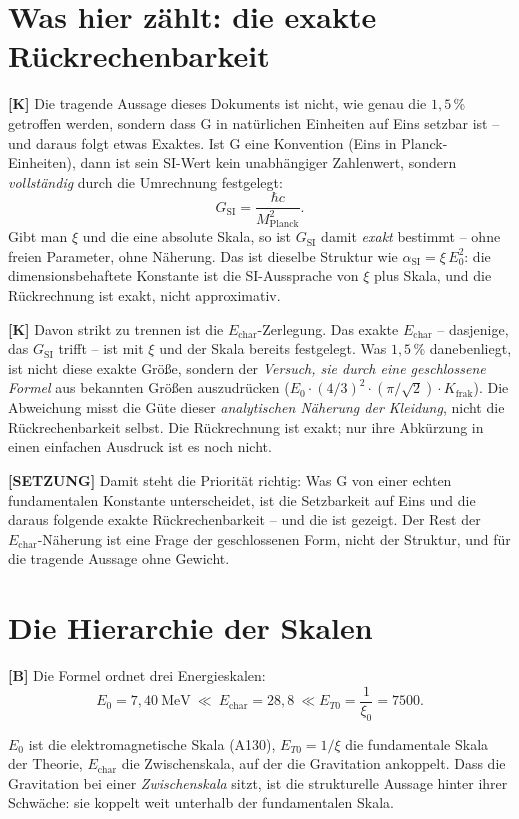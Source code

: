 \section{Was hier zählt: die exakte Rückrechenbarkeit}

\textbf{[K]} Die tragende Aussage dieses Dokuments ist nicht, wie genau die
$1{,}5\,\%$ getroffen werden, sondern dass G in natürlichen Einheiten auf Eins
setzbar ist -- und daraus folgt etwas Exaktes. Ist G eine Konvention (Eins in
Planck-Einheiten), dann ist sein SI-Wert kein unabhängiger Zahlenwert, sondern
\emph{vollständig} durch die Umrechnung festgelegt:
\[
  G_\text{SI} = \frac{\hbar c}{M_\text{Planck}^2} .
\]
Gibt man $\xi$ und die eine absolute Skala, so ist $G_\text{SI}$ damit
\emph{exakt} bestimmt -- ohne freien Parameter, ohne Näherung. Das ist dieselbe
Struktur wie $\alpha_\text{SI} = \xi\,E_0^2$: die dimensionsbehaftete Konstante
ist die SI-Aussprache von $\xi$ plus Skala, und die Rückrechnung ist exakt, nicht
approximativ.

\textbf{[K]} Davon strikt zu trennen ist die $E_\text{char}$-Zerlegung. Das exakte
$E_\text{char}$ -- dasjenige, das $G_\text{SI}$ trifft -- ist mit $\xi$ und der
Skala bereits festgelegt. Was $1{,}5\,\%$ danebenliegt, ist nicht diese exakte
Größe, sondern der \emph{Versuch, sie durch eine geschlossene Formel} aus
bekannten Größen auszudrücken ($E_0\cdot(4/3)^2\cdot(\pi/\sqrt2)\cdot
K_\text{frak}$). Die Abweichung misst die Güte dieser \emph{analytischen
Näherung der Kleidung}, nicht die Rückrechenbarkeit selbst. Die Rückrechnung ist
exakt; nur ihre Abkürzung in einen einfachen Ausdruck ist es noch nicht.

\textbf{[SETZUNG]} Damit steht die Priorität richtig: Was G von einer echten
fundamentalen Konstante unterscheidet, ist die Setzbarkeit auf Eins und die
daraus folgende exakte Rückrechenbarkeit -- und die ist gezeigt. Der Rest der
$E_\text{char}$-Näherung ist eine Frage der geschlossenen Form, nicht der
Struktur, und für die tragende Aussage ohne Gewicht.

\section{Die Hierarchie der Skalen}

\textbf{[B]} Die Formel ordnet drei Energieskalen:
\[
  E_0 = 7{,}40\ \text{MeV}\ \ll\ E_\text{char} = 28{,}8\ \ll  E_{T0} = \frac{1}{\xi_0} = 7500 .
\]

$E_0$ ist die elektromagnetische Skala (A130), $E_{T0}=1/\xi$ die
fundamentale Skala der Theorie, $E_\text{char}$ die Zwischenskala, auf der die
Gravitation ankoppelt. Dass die Gravitation bei einer \emph{Zwischenskala}
sitzt, ist die strukturelle Aussage hinter ihrer Schwäche: sie koppelt weit
unterhalb der fundamentalen Skala.

